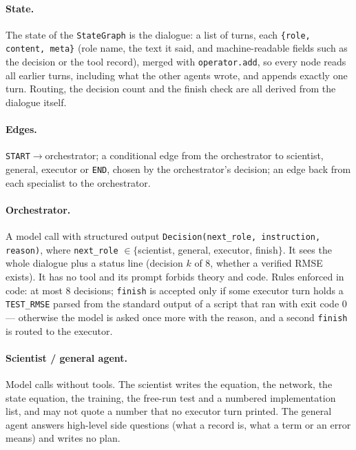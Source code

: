 \paragraph{State.} The state of the \texttt{StateGraph} is the dialogue: a list of turns, each
\texttt{\{role, content, meta\}} (role name, the text it said, and machine-readable fields such as the decision or the tool
record), merged with \texttt{operator.add}, so every node reads all earlier turns, including what the other agents wrote, and
appends exactly one turn. Routing, the decision count and the finish check are all derived from the dialogue itself.

\paragraph{Edges.} \texttt{START}$\to$orchestrator; a conditional edge from the orchestrator to scientist, general, executor
or \texttt{END}, chosen by the orchestrator's decision; an edge back from each specialist to the orchestrator.

\paragraph{Orchestrator.} A model call with structured output \texttt{Decision(next\_role, instruction, reason)}, where
\texttt{next\_role} $\in\{$scientist, general, executor, finish$\}$. It sees the whole dialogue plus a status line (decision
$k$ of 8, whether a verified RMSE exists). It has no tool and its prompt forbids theory and code. Rules enforced in code:
at most 8 decisions; \texttt{finish} is accepted only if some executor turn holds a \texttt{TEST\_RMSE} parsed from the standard
output of a script that ran with exit code 0 --- otherwise the model is asked once more with the reason, and a second
\texttt{finish} is routed to the executor.

\paragraph{Scientist / general agent.} Model calls without tools. The scientist writes the equation, the network, the state
equation, the training, the free-run test and a numbered implementation list, and may not quote a number that no executor turn
printed. The general agent answers high-level side questions (what a record is, what a term or an error means) and writes no plan.


